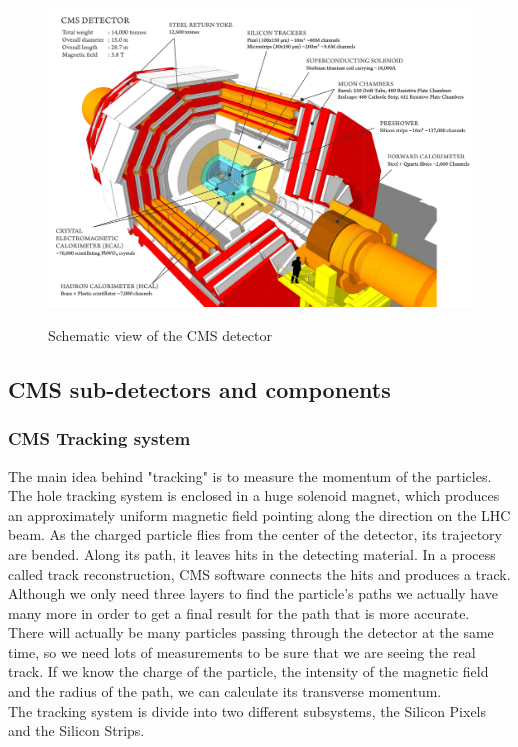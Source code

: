 \begin{figure}[h]
  \centering
\includegraphics[width=15cm]{CMS_chapter_plots/cms_120918_03}
\label{figure}\caption{Schematic view of the CMS detector}
\end{figure}


\subsection{CMS sub-detectors and components}

\subsubsection{CMS Tracking system}

The main idea behind "tracking" is to measure the momentum of the particles. The hole tracking system is enclosed in a huge solenoid magnet, which produces an approximately uniform magnetic field pointing along the direction on the LHC beam. As the charged particle flies from the center of the detector, its trajectory are bended. Along its path, it leaves hits in the detecting material.
In a process called track reconstruction, CMS software connects the hits and produces a track. Although we only need three layers to find the particle's paths we actually have many more in order to get a final result for the path that is more accurate.\\
\indent
There will actually be many particles passing through the detector at the same time, so we need lots of measurements to be sure that we are seeing the real track.
If we know the charge of the particle, the intensity of the magnetic field and the radius of the path, we can calculate its transverse momentum.\\
\indent
The tracking system is divide into two different subsystems, the Silicon Pixels and the Silicon Strips.

